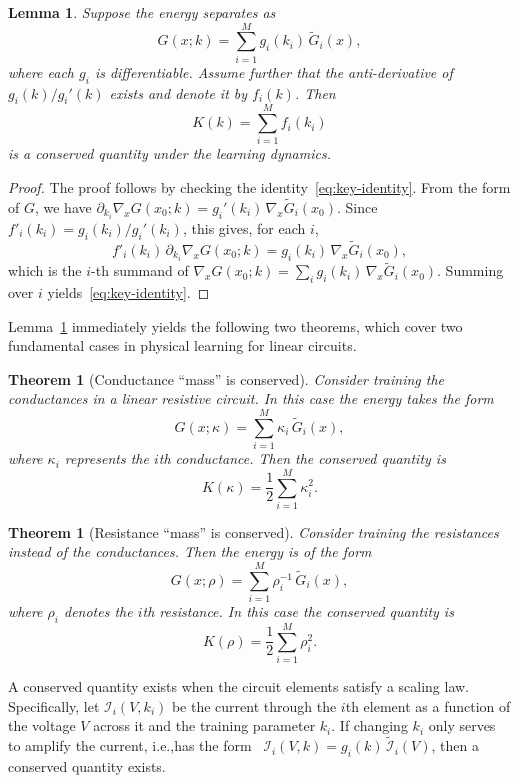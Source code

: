 \documentclass[final, 11pt, nonatbib]{elsarticle}
\theoremstyle{definition}
\theoremstyle{plain}
\newtheorem{theorem}[definition]{Theorem}
\newtheorem{lemma}[definition]{Lemma}
\numberwithin{equation}{section}
\begin{document}
\begin{lemma}
Suppose the energy separates as
\begin{equation}
    G(x;k) = \sum_{i=1}^{M} g_i(k_i)\,\widetilde{G}_i(x),
    \label{eq:Kirchoff_energy}
\end{equation}
where each $g_i$ is differentiable.  Assume further that the anti-derivative of 
$g_i(k)/g_i'(k)$ exists and denote it by $f_i(k)$.  Then
\[
    K(k) = \sum_{i=1}^{M} f_i(k_i)
\]
is a conserved quantity under the learning dynamics.
\label{Lemma:energy_conservation}
\end{lemma}
\begin{proof}
The proof follows by checking the identity~\eqref{eq:key-identity}. From the form of $G$, we have $\partial_{k_i} \nabla_x G(x_0; k) = g_i'(k_i)\,\nabla_x \widetilde{G}_i(x_0)$. Since $f'_i(k_i) = g_i(k_i)/g_i'(k_i)$, this gives, for each $i$,
\[
    f'_i(k_i)\,\partial_{k_i} \nabla_x G(x_0; k) = g_i(k_i)\,\nabla_x \widetilde{G}_i(x_0),
\]
which is the $i$-th summand of $\nabla_x G(x_0;k) = \sum_i g_i(k_i)\,\nabla_x \widetilde{G}_i(x_0)$. Summing over $i$ yields~\eqref{eq:key-identity}.
\end{proof}


Lemma~\ref{Lemma:energy_conservation} immediately yields the following two theorems, which cover two fundamental cases in physical learning for linear circuits.

\begin{theorem}[Conductance ``mass'' is conserved]
    Consider training the conductances in a linear resistive circuit.  
    In this case the energy takes the form
    \[
        G(x;\kappa) = \sum_{i=1}^{M} \kappa_i\,\widetilde{G}_i(x),
    \]
    where $\kappa_i$ represents the $i$th conductance.
    Then the conserved quantity is
    \[
        K(\kappa) = \frac{1}{2}\sum_{i=1}^{M} \kappa_i^2.
    \]
    \label{Thm:Cond}
\end{theorem}

\begin{theorem}[Resistance ``mass'' is conserved]
    Consider training the resistances instead of the conductances.  
    Then the energy is of the form
    \[
        G(x;\rho) = \sum_{i=1}^{M} \rho_i^{-1}\,\widetilde{G}_i(x),
    \]
    where $\rho_i$ denotes the $i$th resistance.
    In this case the conserved quantity is
    \[
        K(\rho) = \frac{1}{2}\sum_{i=1}^{M} \rho_i^2.
    \]
    \label{Thm:Res}
\end{theorem}

A conserved quantity exists when the circuit elements satisfy a scaling law. Specifically, let $\mathscr{I}_i(V,k_i)$ be the current through the $i$th element as a function of the voltage $V$ across it and the training parameter $k_i$. If changing $k_i$ only serves to amplify the current, i.e.,\@ has the form \ $\mathscr{I}_i(V,k) = g_i(k)\,\widetilde{\mathscr{I}}_i(V)$, then a conserved quantity exists.
\end{document}
